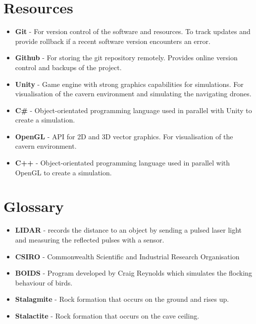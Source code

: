 \documentclass[12pt]{article}
\begin{document}
\pagebreak[4]

\section{Resources}

\begin{itemize}
    \item \textbf{Git} - For version control of the software and resources. To track updates and provide rollback if a recent software version encounters an error.
    \item \textbf{Github} - For storing the git repository remotely. Provides online version control and backups of the project.
    \item \textbf{Unity} - Game engine with strong graphics capabilities for simulations. For visualisation of the cavern environment and simulating the navigating drones.
    \item \textbf{C\#} - Object-orientated programming language used in parallel with Unity to create a simulation.
    \item \textbf{OpenGL} - API for 2D and 3D vector graphics. For visualisation of the cavern environment.
    \item \textbf{C++} - Object-orientated programming language used in parallel with OpenGL to create a simulation.
\end{itemize}

\section{Glossary}

\begin{itemize}
    \item \textbf{LIDAR} - records the distance to an object by sending a pulsed laser light and measuring the reflected pulses with a sensor. 
    \item \textbf{CSIRO} - Commonwealth Scientific and Industrial Research Organisation
    \item \textbf{BOIDS} - Program developed by Craig Reynolds which simulates the flocking behaviour of birds.
    \item \textbf{Stalagmite} - Rock formation that occurs on the ground and rises up.
    \item \textbf{Stalactite} - Rock formation that occurs on the cave ceiling.
\end{itemize}

\printbibliography
\end{document}
